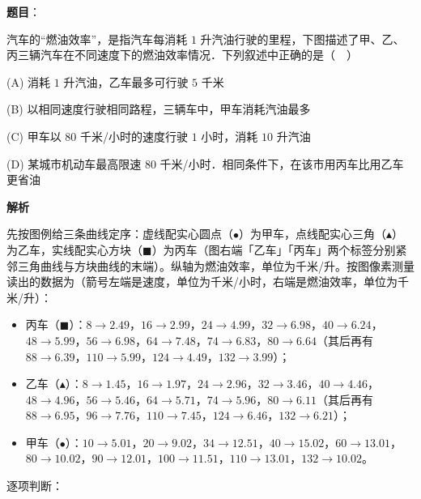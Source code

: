 \begin{answer}

\textbf{题目}：

汽车的“燃油效率”，是指汽车每消耗 \(1\) 升汽油行驶的里程，下图描述了甲、乙、丙三辆汽车在不同速度下的燃油效率情况．下列叙述中正确的是（　）
\nopagebreak[4]
\begin{center}\end{center}
\nopagebreak[4]
(A) 消耗 \(1\) 升汽油，乙车最多可行驶 \(5\) 千米

(B) 以相同速度行驶相同路程，三辆车中，甲车消耗汽油最多

(C) 甲车以 \(80\) 千米/小时的速度行驶 \(1\) 小时，消耗 \(10\) 升汽油

(D) 某城市机动车最高限速 \(80\) 千米/小时．相同条件下，在该市用丙车比用乙车更省油

\textbf{解析}

先按图例给三条曲线定序：虚线配实心圆点（\(\bullet\)）为甲车，点线配实心三角（\(\blacktriangle\)）为乙车，实线配实心方块（\(\blacksquare\)）为丙车（图右端「乙车」「丙车」两个标签分别紧邻三角曲线与方块曲线的末端）。纵轴为燃油效率，单位为千米/升。按图像素测量读出的数据为（箭号左端是速度，单位为千米/小时，右端是燃油效率，单位为千米/升）：

\begin{itemize}
\item 丙车（\(\blacksquare\)）：\(8\to2.49\)，\(16\to2.99\)，\(24\to4.99\)，\(32\to6.98\)，\(40\to6.24\)，\(48\to5.99\)，\(56\to6.98\)，\(64\to7.48\)，\(74\to6.83\)，\(80\to6.64\)（其后再有 \(88\to6.39\)，\(110\to5.99\)，\(124\to4.49\)，\(132\to3.99\)）；
\item 乙车（\(\blacktriangle\)）：\(8\to1.45\)，\(16\to1.97\)，\(24\to2.96\)，\(32\to3.46\)，\(40\to4.46\)，\(48\to4.96\)，\(56\to5.46\)，\(64\to5.71\)，\(74\to5.96\)，\(80\to6.11\)（其后再有 \(88\to6.95\)，\(96\to7.76\)，\(110\to7.45\)，\(124\to6.46\)，\(132\to6.21\)）；
\item 甲车（\(\bullet\)）：\(10\to5.01\)，\(20\to9.02\)，\(34\to12.51\)，\(40\to15.02\)，\(60\to13.01\)，\(80\to10.02\)，\(90\to12.01\)，\(100\to11.51\)，\(110\to13.01\)，\(132\to10.02\)。
\end{itemize}

逐项判断：


\end{answer}
